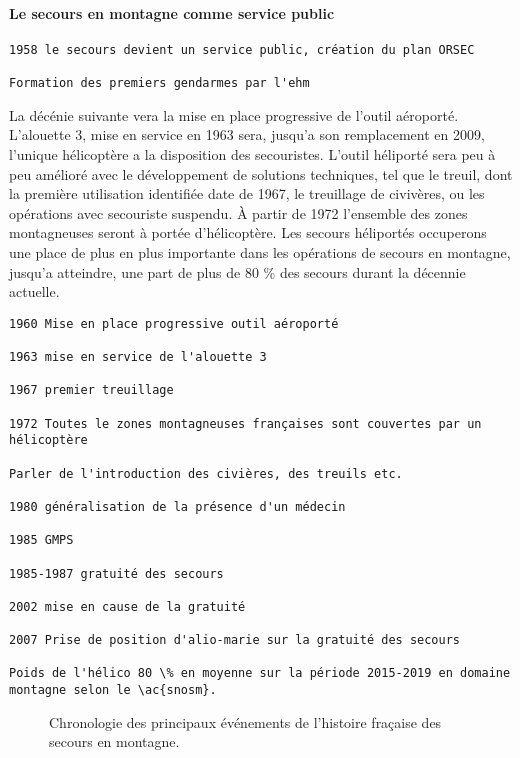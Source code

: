 \paragraph{Le secours en montagne comme service public}
\label{par:1-1-1-1-2}

\begin{verbatim}
1958 le secours devient un service public, création du plan ORSEC

Formation des premiers gendarmes par l'ehm
\end{verbatim}


La décénie suivante vera la mise en place progressive de l'outil
aéroporté. L'alouette 3, mise en service en 1963 sera, jusqu'a son
remplacement en 2009, l'unique hélicoptère a la disposition des
secouristes. L'outil héliporté sera peu à peu amélioré avec le
développement de solutions techniques, tel que le treuil, dont la
première utilisation identifiée date de 1967, le treuillage de
civivères, ou les opérations avec secouriste suspendu. À partir de
1972 l'ensemble des zones montagneuses seront à portée
d'hélicoptère. Les secours héliportés occuperons une place de plus en
plus importante dans les opérations de secours en montagne, jusqu'a
atteindre, une part de plus de 80 \% des secours durant la décennie
actuelle.

\begin{verbatim}
1960 Mise en place progressive outil aéroporté

1963 mise en service de l'alouette 3

1967 premier treuillage

1972 Toutes le zones montagneuses françaises sont couvertes par un
hélicoptère

Parler de l'introduction des civières, des treuils etc.

1980 généralisation de la présence d'un médecin

1985 GMPS

1985-1987 gratuité des secours

2002 mise en cause de la gratuité

2007 Prise de position d'alio-marie sur la gratuité des secours

Poids de l'hélico 80 \% en moyenne sur la période 2015-2019 en domaine
montagne selon le \ac{snosm}.
\end{verbatim}

\begin{figure}
  \centering
   
   \caption{Chronologie des principaux événements de
     l'histoire fraçaise des secours en montagne.}
  \label{fig:frise_chronologique}
\end{figure}


